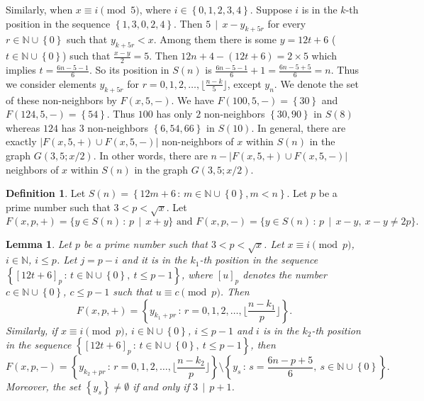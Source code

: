 \documentclass[11pt]{article}
\newtheorem{lemma}[theorem]{Lemma}
\theoremstyle{definition}
\newtheorem{definition}[theorem]{Definition}
\theoremstyle{remark}
\numberwithin{equation}{section}
\newcommand{\Nat}{\mathbb{N}}
\newcommand{\set}[1]{\left\{#1\right\}}
\newcommand{\Set}[2]{\set{#1\, :\, #2}}
\newcommand{\Mod}[3]{#1\equiv #2 \pmod{#3}}
\newcommand{\Div}[2]{#1\,\mid\, #2}
\begin{document}
\vspace{1em}
\noindent
Similarly, when $\Mod{x}{i}{5}$, where $i\in\set{0,1,2,3,4}$. Suppose $i$ is in the $k$-th position in the sequence $\set{1,3,0,2,4}$. Then $\Div{5}{x-y_{k+5r}}$ for every $r\in\Nat\cup\set{0}$ such that $y_{k+5r}<x$. Among them there is some $y=12t+6$ ($t\in\Nat\cup\set{0}$) such that $\frac{x-y}{2}=5$. Then $12n+4-(12t+6)=2\times 5$ which implies $t=\frac{6n-5-1}{6}$. So its position in $S(n)$ is $\frac{6n-5-1}{6}+1=\frac{6n-5+5}{6}=n$. Thus we consider elements $y_{k+5r}$ for $r=0,1,2,\ldots,\lfloor \frac{n-k}{5}\rfloor$, except $y_n$. We denote the set of these non-neighbors by $F(x,5,-)$. We have $F(100,5,-)=\set{30}$ and $F(124,5,-)=\set{54}$. Thus $100$ has only $2$ non-neighbors $\set{30,90}$ in $S(8)$ whereas $124$ has $3$ non-neighbors $\set{6,54,66}$ in $S(10)$. In general, there are exactly $|F(x,5,+)\cup F(x,5,-)|$ non-neighbors of $x$ within $S(n)$ in the graph $G(3,5;x/2)$. In other words, there are $n-|F(x,5,+)\cup F(x,5,-)|$ neighbors of $x$ within $S(n)$ in the graph $G(3,5;x/2)$.

\begin{definition}\label{deffp}
Let $S(n)=\Set{12m+6}{m\in\Nat\cup\set{0}, m<n}$. Let $p$ be a prime number such that $3<p<\sqrt{x}$. Let 
$$F(x,p,+)=\{y\in S(n)\, :\, \Div{p}{x+y}\} \text{ and } F(x,p,-)=\{y\in S(n)\, :\, \Div{p}{x-y},\ x-y\neq 2p\}.$$ 
\end{definition}

\begin{lemma}\label{lem12n4}
Let $p$ be a prime number such that $3<p<\sqrt{x}$. Let $\Mod{x}{i}{p}$, $i\in\Nat$, $i\leq p$. Let $j=p-i$ and it is in the $k_1$-th position in the sequence $\Set{[12t+6]_p}{t\in\Nat\cup\set{0},\ t\leq p-1}$, where $[u]_p$ denotes the number $c\in\Nat\cup\set{0}$, $c\leq p-1$ such that $\Mod{u}{c}{p}$. Then 
$$F(x,p,+)=\Set{y_{k_1+pr}}{r=0,1,2,\ldots,\lfloor \frac{n-k_1}{p}\rfloor}.$$
Similarly, if $\Mod{x}{i}{p}$, $i\in\Nat\cup\set{0}$, $i\leq p-1$ and $i$ is in the $k_2$-th position in the sequence $\Set{[12t+6]_p}{t\in\Nat\cup\set{0},\ t\leq p-1}$, then 
$$F(x,p,-)=\Set{y_{k_2+pr}}{r=0,1,2,\ldots,\lfloor \frac{n-k_2}{p}\rfloor} \setminus\Set{y_s}{s=\frac{6n-p+5}{6},\ s\in\Nat\cup\set{0}}.$$
Moreover, the set $\set{y_s}\neq\emptyset$ if and only if $\Div{3}{p+1}$.
\end{lemma}
\end{document}
